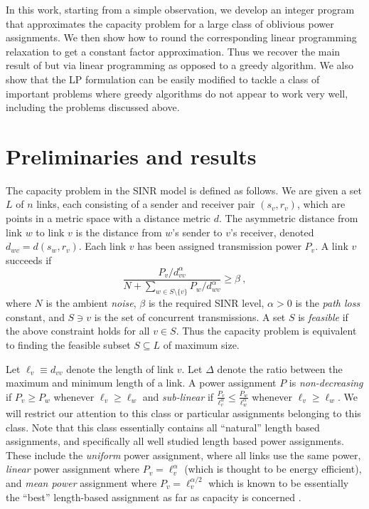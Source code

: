 \documentclass[11pt]{amsart}
\begin{document}
In this work, starting from a simple observation, we develop an integer program that approximates the capacity problem for a large class of oblivious power assignments.
We then show how to round the corresponding linear programming relaxation to get a constant factor approximation.
Thus we recover the main result of \cite{SODA11} but via linear programming as opposed to a greedy algorithm. 
We also show that the LP formulation can be easily modified to tackle a class of important problems where
greedy algorithms do not appear to work very well, including the
problems discussed above.

\section{Preliminaries and results}
\label{sec:model}

The capacity problem in the SINR model is defined as follows.
We are given a set $L$ of $n$ links, 
each consisting of a sender and receiver pair $(s_v, r_v)$, 
which are points in a metric space with a distance metric $d$.
The asymmetric distance from link $w$ to link $v$ is the distance from
$w$'s sender to $v$'s receiver, denoted $d_{wv} = d(s_w, r_v)$.
Each link $v$ has been assigned transmission power $P_v$. 
A link $v$ succeeds if
\begin{equation}
\frac{P_v/d_{vv}^{\alpha}}{N + \sum_{w \in S \setminus \{v\}} P_w/d_{wv}^{\alpha}} \geq \beta\ ,
\label{gen_sinr}
\end{equation}
where $N$ is the ambient \emph{noise}, $\beta$ is the required SINR level,
$\alpha > 0$ is the \emph{path loss} constant, and 
$S \ni v$  is the set of concurrent transmissions. A set $S$ is \emph{feasible} if the above constraint holds for all $v \in S$. Thus the capacity problem is equivalent to finding
the feasible subset $S \subseteq L$ of maximum size.

Let $\ell_v \equiv d_{vv}$ denote the length of link $v$.
Let $\Delta$ denote the ratio between the maximum and minimum length of a link.
A power assignment $P$ is \emph{non-decreasing} if $P_v \ge P_w$ whenever
$\ell_v \ge \ell_w$ and \emph{sub-linear} if $\frac{P_v}{\ell_v^{\alpha}} \le \frac{P_w}{\ell_w^{\alpha}}$ whenever $\ell_v \ge \ell_w$. We will restrict our attention to this class or particular assignments belonging to this class. 
Note that this class essentially contains all ``natural'' length based assignments, and specifically all
 well studied length based power assignments. These include the \emph{uniform} power assignment, where all links use the same power, \emph{linear} power assignment where $P_v = \ell_v^{\alpha}$ (which is thought to be energy efficient), and \emph{mean power} assignment where $P_v = \ell_v^{\alpha/2}$ which is known to be 
essentially the ``best'' length-based assignment as far as capacity is concerned \cite{us:esa09full,SODA11}.
\end{document}
